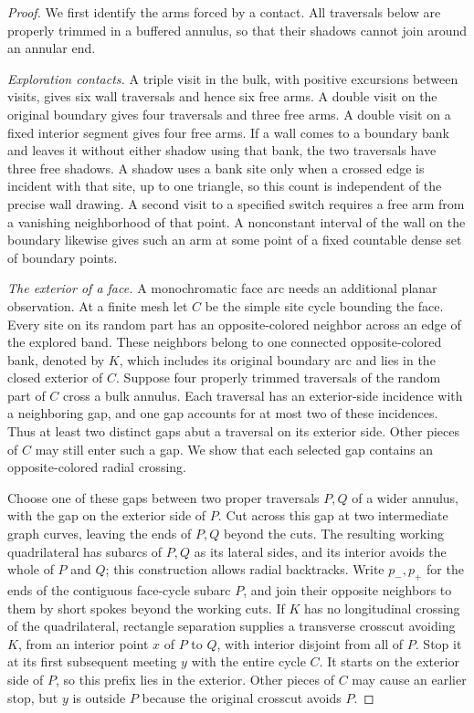 \begin{proof}
We first identify the arms forced by a contact.  All traversals below
are properly trimmed in a buffered annulus, so that their shadows
cannot join around an annular end.

\emph{Exploration contacts.}
A triple visit in the bulk, with positive excursions between visits,
gives six wall traversals and hence six free arms.  A double visit
on the original boundary gives four traversals and three free arms.
A double visit on a fixed interior segment gives four free arms.
If a wall comes to a boundary bank and leaves it without either
shadow using that bank, the two traversals have three free shadows.
A shadow uses a bank site only when a crossed edge is incident with
that site, up to one triangle, so this count is independent of the
precise wall drawing.  A second visit to a specified switch requires
a free arm from a vanishing neighborhood of that point.  A
nonconstant interval of the wall on the boundary likewise gives
such an arm at some point of a fixed countable dense set of boundary
points.

\emph{The exterior of a face.}
A monochromatic face arc needs an additional planar observation.
At a finite mesh let $C$ be the simple site cycle bounding the face.
Every site on its random part has an opposite-colored neighbor
across an edge of the explored band.  These neighbors belong to one
connected opposite-colored bank, denoted by $K$, which includes its
original boundary arc and lies in the closed exterior of $C$.
Suppose four properly trimmed traversals of the random part of $C$
cross a bulk annulus.  Each traversal has an exterior-side
incidence with a neighboring gap, and one gap accounts for at most two of these incidences.
Thus at least two distinct gaps abut a traversal on its exterior
side.  Other pieces of $C$ may still enter such a gap.  We show
that each selected gap contains an opposite-colored radial crossing.

Choose one of these gaps between two proper traversals $P,Q$ of
a wider annulus, with the gap on the exterior side of $P$.  Cut
across this gap at two intermediate graph
curves, leaving the ends of $P,Q$ beyond the cuts.  The resulting
working quadrilateral has subarcs of $P,Q$ as its lateral sides,
and its interior avoids the whole of $P$ and $Q$; this construction
allows radial backtracks.  Write $p_-,p_+$ for the ends of the
contiguous face-cycle subarc $P$, and join their opposite neighbors
to them by short spokes beyond the working cuts.  If $K$ has no
longitudinal crossing of the quadrilateral, rectangle separation
supplies a transverse crosscut avoiding $K$, from an interior point
$x$ of $P$ to $Q$, with interior disjoint from all of $P$.
Stop it at its first subsequent meeting $y$ with the entire cycle
$C$.  It starts on the exterior side of $P$, so this prefix lies
in the exterior.  Other pieces of $C$ may cause an earlier stop,
but $y$ is outside $P$ because the original crosscut avoids $P$.


\end{proof}
